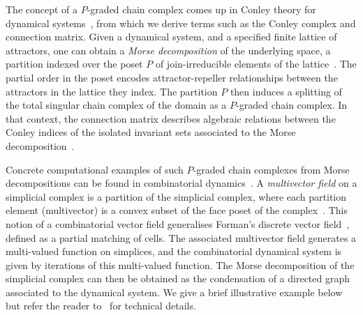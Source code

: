 \documentclass[11pt, table, nothms]{amsart}
\theoremstyle{definition}
\begin{document}
{The concept of a $P$-graded chain complex {comes up} in Conley theory for dynamical systems~\cite{Conley1978IsolatedIndex,Mischaikow1995ConleyTheory}, from which we derive {terms} such as the Conley complex and connection matrix. 
Given a dynamical system, and a specified finite lattice of attractors, one can obtain a \emph{Morse decomposition} of the underlying space, a partition indexed over the poset $P$ of join-irreducible elements of the lattice~\cite{Robbin1992LyapunovFunctor,harker2021}. 
The partial order in the poset encodes attractor-repeller relationships between the attractors in the lattice they index. 
The partition $P$ then induces a splitting of the total singular chain complex of the domain as a $P$-graded chain complex. 
In that context, the connection matrix describes algebraic relations between the Conley indices of the isolated invariant sets associated to the Morse decomposition~\cite{Robbin1992LyapunovFunctor,Mischaikow1995ConleyTheory}.

Concrete computational examples of such $P$-graded chain complexes from Morse decompositions can be found in combinatorial dynamics~\cite{Batko2020LinkingDecompositions,Dey2022PersistenceSystems,Lipinski2023Conley-Morse-FormanSpaces,Dey2024ComputingReductions}. A \emph{multivector field} on a simplicial complex is a partition of the simplicial complex, where each partition element (multivector) is a convex subset of the face poset of the complex~\cite[Def 2.2]{Dey2024ComputingReductions}. This notion of a combinatorial vector field generalises Forman's discrete vector field~\cite{Forman1998MorseComplexes}, defined as a partial matching of cells. The associated multivector field generates a multi-valued function on simplices, and the combinatorial dynamical system is given by iterations of this multi-valued function. The Morse decomposition of the simplicial complex can then be obtained as the condensation of a directed graph associated to the dynamical system. We give a brief illustrative example below but refer the reader to~\cite[\S 3.4]{Dey2019PersistentDynamics} for technical details. 

}
\end{document}
